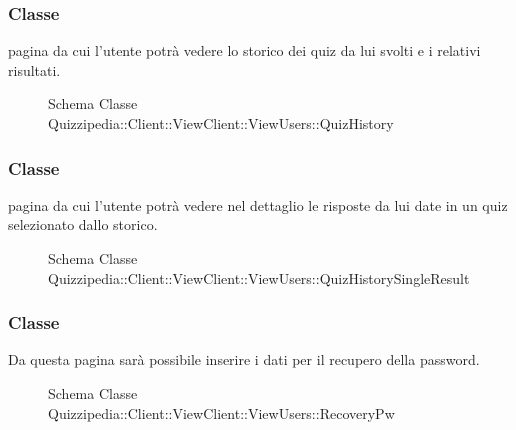 \subsubsection{Classe }
pagina da cui l'utente potrà vedere lo storico dei quiz da lui svolti e i relativi risultati.
\begin{figure}[H]
\centering
\noindent{}
\caption[Schema Classe QuizHistory]{Schema Classe Quizzipedia::Client::ViewClient::ViewUsers::QuizHistory}
\end{figure}
\subsubsection{Classe }
pagina da cui l'utente potrà vedere nel dettaglio le risposte da lui date in un quiz selezionato dallo storico.
\begin{figure}[H]
\centering
\noindent{}
\caption[Schema Classe QuizHistorySingleResult]{Schema Classe Quizzipedia::Client::ViewClient::ViewUsers::QuizHistorySingleResult}
\end{figure}
\subsubsection{Classe }
Da questa pagina sarà possibile inserire i dati per il recupero della password.
\begin{figure}[H]
\centering
\noindent{}
\caption[Schema Classe RecoveryPw]{Schema Classe Quizzipedia::Client::ViewClient::ViewUsers::RecoveryPw}
\end{figure}
